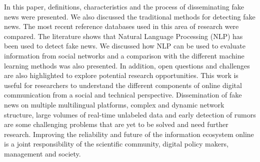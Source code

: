 \documentclass{ieeeaccess}
\begin{document}
In this paper, definitions, characteristics and the process of disseminating fake news were presented. We also discussed the traditional methods for detecting fake news. The most recent reference databases used in this area of research were compared. The literature shows that Natural Language Processing (NLP) has been used to detect fake news. We discussed how NLP can be used to evaluate information from  social networks and a comparison with the different machine learning methods was also presented. %
In addition, open questions and challenges are also highlighted to explore potential research opportunities. This work is useful for researchers to understand the different components of online digital communication from a social and technical perspective. Dissemination of fake news on multiple multilingual platforms, complex and dynamic network structure, large volumes of real-time unlabeled data and early detection of rumors are some challenging problems that are yet to be solved and need further research. %
Improving the reliability and future of the information ecosystem online is a joint responsibility of the scientific community, digital policy makers, management and society.
\end{document}
